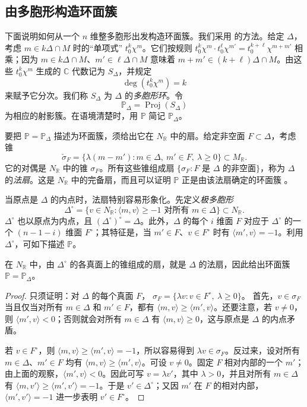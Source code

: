 \subsection{由多胞形构造环面簇}\label{subsec:toric-from-polytopes}

下面说明如何从一个 $n$ 维整多胞形出发构造环面簇。我们采用  的方法。给定 $\Delta$，考虑 $m\in k\Delta\cap M$ 时的“单项式” $t_0^k\chi^m$。它们按规则
$t_0^k\chi^m\cdot t_0^\ell\chi^{m'}
=t_0^{k+\ell}\chi^{m+m'}$
相乘；因为 $m\in k\Delta\cap M$、$m'\in\ell\Delta\cap M$ 意味着 $m+m'\in(k+\ell)\Delta\cap M$。由这些 $t_0^k\chi^m$ 生成的 $\mathbb C$ 代数记为 $S_\Delta$，并规定
\[
\deg(t_0^k\chi^m)=k
\]
来赋予它分次。我们称 $S_\Delta$ 为 $\Delta$ 的\emph{多胞形环}。令
\[
\mathbb P_\Delta=\operatorname{Proj}(S_\Delta)
\]
为相应的射影簇。在语境清楚时，用 $\mathbb P$ 简记 $\mathbb P_\Delta$。

要把 $\mathbb P=\mathbb P_\Delta$ 描述为环面簇，须给出它在 $N_{\mathbb R}$ 中的扇。给定非空面 $F\subset\Delta$，考虑锥
\[
\check\sigma_F
=\{\lambda(m-m'):m\in\Delta,\ m'\in F,\ \lambda\geq0\}
\subset M_{\mathbb R}.
\]
它的对偶是 $N_{\mathbb R}$ 中的锥 $\sigma_F$。所有这些锥组成扇
$\{\sigma_F:F\text{ 是 }\Delta\text{ 的非空面}\}$，称为 $\Delta$ 的\emph{法扇}。这是 $N_{\mathbb R}$ 中的完备扇，而且可以证明 $\mathbb P$ 正是由该法扇确定的环面簇 。

当原点是 $\Delta$ 的内点时，法扇特别容易形象化。先定义\emph{极多胞形}
\[
\Delta^\circ
=\{v\in N_{\mathbb R}:\langle m,v\rangle\geq-1
\text{ 对所有 }m\in\Delta\}\subset N_{\mathbb R}.
\]
$\Delta^\circ$ 也以原点为内点，且 $(\Delta^\circ)^\circ=\Delta$。此外，$\Delta$ 的每个 $i$ 维面 $F$ 对应于 $\Delta^\circ$ 的一个 $(n-1-i)$ 维面 $F^\circ$；其特征是，当 $m'\in F$、$v\in F^\circ$ 时有 $\langle m',v\rangle=-1$。利用 $\Delta^\circ$，可如下描述 $\mathbb P$。

\begin{lemma}\label{lem:normal-polar}
在 $N_{\mathbb R}$ 中，由 $\Delta^\circ$ 的各真面上的锥组成的扇，就是 $\Delta$ 的法扇，因此给出环面簇 $\mathbb P=\mathbb P_\Delta$。
\end{lemma}
\begin{proof}
只须证明：对 $\Delta$ 的每个真面 $F$，
$\sigma_F=\{\lambda v:v\in F^\circ,\ \lambda\geq0\}$。
首先，$v\in\sigma_F$ 当且仅当对所有 $m\in\Delta$ 和 $m'\in F$，都有 $\langle m,v\rangle\geq\langle m',v\rangle$。还要注意，若 $v\ne0$，则 $\langle m',v\rangle<0$；否则就会对所有 $m\in\Delta$ 有 $\langle m,v\rangle\geq0$，这与原点是 $\Delta$ 的内点矛盾。

若 $v\in F^\circ$，则 $\langle m,v\rangle\geq\langle m',v\rangle=-1$，所以容易得到 $\lambda v\in\sigma_F$。反过来，设对所有 $m\in\Delta$、$m'\in F$ 均有 $\langle m,v\rangle\geq\langle m',v\rangle$。可设 $v\ne0$。固定 $F$ 相对内部的一个 $m'$；由上面的观察，$\langle m',v\rangle<0$。因此可写 $v=\lambda v'$，其中 $\lambda>0$，并且对所有 $m\in\Delta$ 有 $\langle m,v'\rangle\geq\langle m',v'\rangle=-1$。于是 $v'\in\Delta^\circ$；又因 $m'$ 在 $F$ 的相对内部，$\langle m',v'\rangle=-1$ 进一步表明 $v'\in F^\circ$。
\end{proof}

